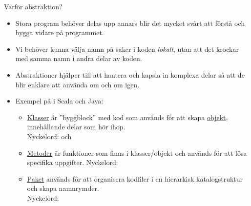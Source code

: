 \begin{Slide}{Varför abstraktion?}
\begin{itemize}
\item Stora program behöver delas upp annars blir det mycket svårt att förstå och bygga vidare på programmet.
\item Vi behöver kunna välja namn på saker i koden \textit{lokalt}, utan att det krockar med samma namn i andra delar av koden.
\item Abstraktioner hjälper till att hantera och kapsla in komplexa delar så att de blir enklare att använda om och om igen.

\item Exempel på  i Scala och Java:
\begin{itemize}

\item \href{https://sv.wikipedia.org/wiki/Klass_\%28programmering\%29}{Klasser} är ''byggblock'' med kod som används för att skapa \href{https://sv.wikipedia.org/wiki/Objektorienterad_programmering\#Objekt}{objekt}, innehållande delar som hör ihop. \\ Nyckelord:  och 

\item \href{https://en.wikipedia.org/wiki/Method_\%28computer_programming\%29}{Metoder} är funktioner som finns i klasser/objekt och används för att lösa specifika uppgifter.  Nyckelord: 

\item \href{https://en.wikipedia.org/wiki/Java_package}{Paket} används för att organisera kodfiler i en hierarkisk katalogstruktur och skapa namnrymder. \\Nyckelord: 

\end{itemize}

\end{itemize}
\end{Slide}





